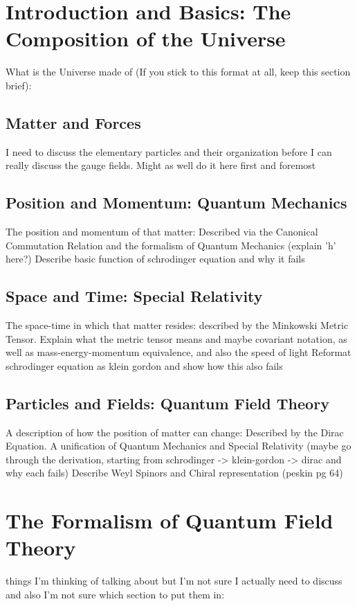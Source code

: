 \section{Introduction and Basics: The Composition of the Universe} 

    What is the Universe made of (If you stick to this format at all, keep this section brief):

    \subsection{Matter and Forces}
       I need to discuss the elementary particles and their organization before I can really discuss the gauge fields.
       Might as well do it here first and foremost

    \subsection{Position and Momentum: Quantum Mechanics}
       The position and momentum of that matter:
           Described via the Canonical Commutation Relation and the formalism of Quantum Mechanics
           (explain 'h' here?)
       Describe basic function of schrodinger equation and why it fails

    \subsection{Space and Time: Special Relativity}
       The space-time in which that matter resides: described by the Minkowski Metric Tensor.
        Explain what the metric tensor means and maybe covariant notation,
        as well as mass-energy-momentum equivalence,
        and also the speed of light
        Reformat schrodinger equation as klein gordon and show how this also fails


    \subsection{Particles and Fields: Quantum Field Theory}
       A description of how the position of matter can change: Described by the Dirac Equation.
        A unification of Quantum Mechanics and Special Relativity
        (maybe go through the derivation, starting from schrodinger -> klein-gordon -> dirac and why each fails)
        Describe Weyl Spinors and Chiral representation (peskin pg 64)


\section{The Formalism of Quantum Field Theory}
    things I'm thinking of talking about but I'm not sure I actually need to discuss and also I'm not sure which section to put them in:

